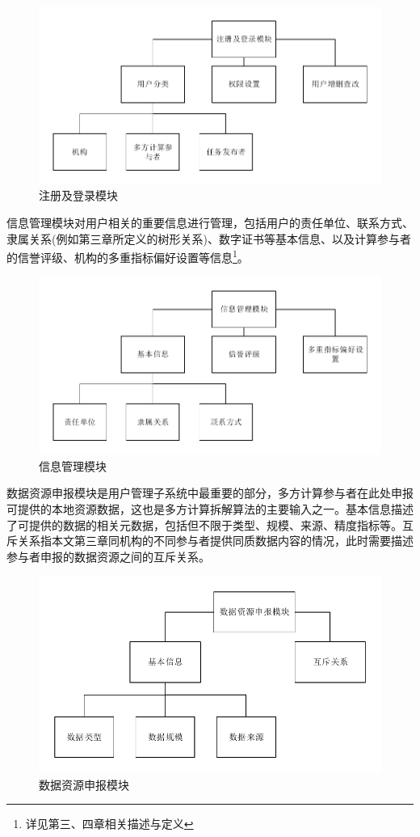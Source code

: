\documentclass[promaster]{thesis-uestc}
\begin{document}
\begin{figure}[h]
    \includegraphics[width=350pt]{pic/registerandlogin.pdf}
    \caption{注册及登录模块}
\end{figure}

信息管理模块对用户相关的重要信息进行管理，包括用户的责任单位、联系方式、隶属关系(例如第三章所定义的树形关系)、数字证书等基本信息、以及计算参与者的信誉评级、机构的多重指标偏好设置等信息\footnote{详见第三、四章相关描述与定义}。
\begin{figure}[H]
    \includegraphics[width=350pt]{pic/information.pdf}
    \caption{信息管理模块}
\end{figure}

数据资源申报模块是用户管理子系统中最重要的部分，多方计算参与者在此处申报可提供的本地资源数据，这也是多方计算拆解算法的主要输入之一。基本信息描述了可提供的数据的相关元数据，包括但不限于类型、规模、来源、精度指标等。互斥关系指本文第三章同机构的不同参与者提供同质数据内容的情况，此时需要描述参与者申报的数据资源之间的互斥关系。

\begin{figure}[H]
    \includegraphics[width=350pt]{pic/application.pdf}
    \caption{数据资源申报模块}
\end{figure}
\end{document}
